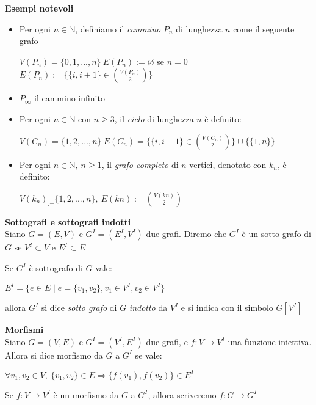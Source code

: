 \documentclass[12pt, a4paper]{article}
\begin{document}
\textbf{Esempi notevoli}
\begin{itemize}
    \item Per ogni $n\in\mathbb{N}$, definiamo il \textit{cammino} $P_{n}$ di lunghezza $n$ come il
    seguente grafo 
    \begin{center}
        $V(P_{n})=\{0,1,...,n\}\ E(P_{n}):= \varnothing $ se $n=0$\\
        $E(P_{n}):=\{\{i,i+1\}\in\binom{V(P_{n})}{2}\}$ 
    \end{center}
    \item $P_{\infty}$ il cammino infinito
    \item Per ogni $n\in\mathbb{N}$ con $n\geq 3$, il \textit{ciclo} di lunghezza $n$ è definito:
    \begin{center}
        $V(C_{n})=\{1,2,...,n\}\ E(C_{n})=\{\{i,i+1\}\in\binom{V(C_{n})}{2}\}\cup\{\{1,n\}\}$
    \end{center}
    \item Per ogni $n\in\mathbb{N},\ n\geq 1$, il \textit{grafo completo} di $n$ vertici, denotato con
    $k_{n}$, è definito:
    \begin{center}
        $V(k_{n})_:=\{1,2,...,n\},\ E(kn):=\binom{V(kn)}{2}$
    \end{center}
\end{itemize}

\newpage
\textbf{Sottografi e sottografi indotti}\\ Siano $G=(E,V)$ e $G^{I}=(E^{I},V^{I})$ due grafi. Diremo 
che $G^{I}$ è un sotto grafo di $G$ se $V^{I}\subset V$ e $E^{I}\subset E$

Se $G^{I}$ è sottografo di $G$ vale:
\begin{center}
    $E^{I}=\{e\in E\mid e=\{v_{1},v_{2}\}, v_{1}\in V^{I},v_{2}\in V^{I}\}$
\end{center}
allora $G^{I}$ si dice \textit{sotto grafo} di $G$ \textit{indotto} da $V^{I}$ e si indica con il
simbolo $G[V^{I}]$


\textbf{Morfismi}\\ Siano $G=(V,E)$ e $G^{I}=(V^{I},E^{I})$ due grafi, e $f:V\rightarrow V^{I}$ 
una funzione iniettiva. Allora si dice morfismo da $G$ a $G^{I}$ se vale:
\begin{center}
    $\forall v_{1},v_{2}\in V,\ \{v_{1},v_{2}\}\in E\Rightarrow \{f(v_{1}),f(v_{2})\}\in E^{I}$
\end{center}
Se $f:V\rightarrow V^{I}$ è un morfismo da $G$ a $G^{I}$, allora scriveremo $f:G\rightarrow G^{I}$
\end{document}
